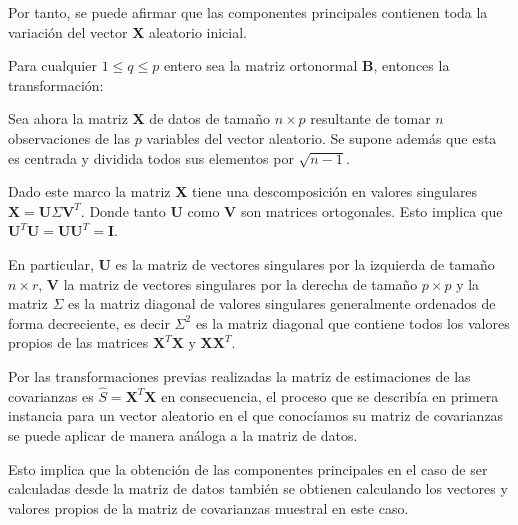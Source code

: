 \noindent Por tanto, se puede afirmar que las componentes principales contienen toda la variación del vector \textbf{X} aleatorio inicial.


\begin{propo}
Para cualquier $1\leq q \leq p $ entero sea la matriz ortonormal $\textbf{B}$, entonces la transformación:
\begin{equation}

\end{equation}
\end{propo}

\noindent Sea ahora la matriz \textbf{X} de datos de tamaño $n \times p$ resultante de tomar $n$ observaciones de las $p$ variables del vector aleatorio. Se supone además que esta es centrada y dividida todos sus elementos por $\sqrt{n-1}$. 

\noindent Dado este marco la matriz \textbf{X} tiene una descomposición en valores singulares $\textbf{X}=\textbf{U}\Sigma \textbf{V}^T$. Donde tanto \textbf{U} como $\textbf{V}$ son matrices ortogonales. Esto implica que $\textbf{U}^T \textbf{U}=\textbf{U}\textbf{U}^T=\textbf{I}$. 

\noindent  En particular, \textbf{U} es la matriz de vectores singulares por la izquierda  de tamaño $n \times r$, \textbf{V} la matriz de vectores singulares por la derecha de tamaño $p \times p$ y la matriz $\Sigma$ es la matriz diagonal de valores singulares generalmente ordenados de forma decreciente, es decir $\Sigma^2$ es la matriz diagonal que contiene todos los valores propios de las matrices $\textbf{X}^T\textbf{X}$ y $\textbf{X}\textbf{X}^T$.

\noindent Por las transformaciones previas realizadas la matriz de estimaciones de las covarianzas es $\hat{S}=\textbf{X}^T\textbf{X}$ en consecuencia, el proceso que se describía en primera instancia para un vector aleatorio en el que conocíamos su matriz de covarianzas se puede aplicar de manera análoga a la matriz de datos.

\noindent Esto implica que la obtención de las componentes principales en el caso de ser calculadas desde la matriz de datos también se obtienen calculando los vectores y valores propios de la matriz de covarianzas muestral en este caso. 

